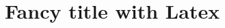 \documentclass[10pt,a4paper]{report}
\begin{document}
    \chapter{Fancy title with Latex}
    \lipsum[4]
\end{document}
